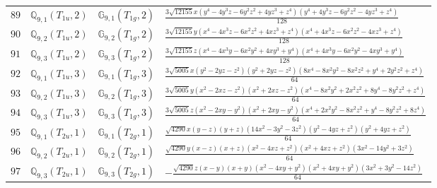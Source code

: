 \documentclass[fleqn,8pt,landscape]{jsarticle}
\begin{document}
\begin{table}[ht!]
\begin{center}
\begin{tabular}{cccl}
$ 89 $ & $ \mathbb{Q}_{9,1}(T_{1u},2) $ & $ \mathbb{G}_{9,1}(T_{1g},2) $ & $ \frac{3 \sqrt{12155} x \left(y^{4} - 4 y^{3} z - 6 y^{2} z^{2} + 4 y z^{3} + z^{4}\right) \left(y^{4} + 4 y^{3} z - 6 y^{2} z^{2} - 4 y z^{3} + z^{4}\right)}{128} $ \\
$ 90 $ & $ \mathbb{Q}_{9,2}(T_{1u},2) $ & $ \mathbb{G}_{9,2}(T_{1g},2) $ & $ \frac{3 \sqrt{12155} y \left(x^{4} - 4 x^{3} z - 6 x^{2} z^{2} + 4 x z^{3} + z^{4}\right) \left(x^{4} + 4 x^{3} z - 6 x^{2} z^{2} - 4 x z^{3} + z^{4}\right)}{128} $ \\
$ 91 $ & $ \mathbb{Q}_{9,3}(T_{1u},2) $ & $ \mathbb{G}_{9,3}(T_{1g},2) $ & $ \frac{3 \sqrt{12155} z \left(x^{4} - 4 x^{3} y - 6 x^{2} y^{2} + 4 x y^{3} + y^{4}\right) \left(x^{4} + 4 x^{3} y - 6 x^{2} y^{2} - 4 x y^{3} + y^{4}\right)}{128} $ \\
$ 92 $ & $ \mathbb{Q}_{9,1}(T_{1u},3) $ & $ \mathbb{G}_{9,1}(T_{1g},3) $ & $ \frac{3 \sqrt{5005} x \left(y^{2} - 2 y z - z^{2}\right) \left(y^{2} + 2 y z - z^{2}\right) \left(8 x^{4} - 8 x^{2} y^{2} - 8 x^{2} z^{2} + y^{4} + 2 y^{2} z^{2} + z^{4}\right)}{64} $ \\
$ 93 $ & $ \mathbb{Q}_{9,2}(T_{1u},3) $ & $ \mathbb{G}_{9,2}(T_{1g},3) $ & $ \frac{3 \sqrt{5005} y \left(x^{2} - 2 x z - z^{2}\right) \left(x^{2} + 2 x z - z^{2}\right) \left(x^{4} - 8 x^{2} y^{2} + 2 x^{2} z^{2} + 8 y^{4} - 8 y^{2} z^{2} + z^{4}\right)}{64} $ \\
$ 94 $ & $ \mathbb{Q}_{9,3}(T_{1u},3) $ & $ \mathbb{G}_{9,3}(T_{1g},3) $ & $ \frac{3 \sqrt{5005} z \left(x^{2} - 2 x y - y^{2}\right) \left(x^{2} + 2 x y - y^{2}\right) \left(x^{4} + 2 x^{2} y^{2} - 8 x^{2} z^{2} + y^{4} - 8 y^{2} z^{2} + 8 z^{4}\right)}{64} $ \\
$ 95 $ & $ \mathbb{Q}_{9,1}(T_{2u},1) $ & $ \mathbb{G}_{9,1}(T_{2g},1) $ & $ \frac{\sqrt{4290} x \left(y - z\right) \left(y + z\right) \left(14 x^{2} - 3 y^{2} - 3 z^{2}\right) \left(y^{2} - 4 y z + z^{2}\right) \left(y^{2} + 4 y z + z^{2}\right)}{64} $ \\
$ 96 $ & $ \mathbb{Q}_{9,2}(T_{2u},1) $ & $ \mathbb{G}_{9,2}(T_{2g},1) $ & $ \frac{\sqrt{4290} y \left(x - z\right) \left(x + z\right) \left(x^{2} - 4 x z + z^{2}\right) \left(x^{2} + 4 x z + z^{2}\right) \left(3 x^{2} - 14 y^{2} + 3 z^{2}\right)}{64} $ \\
$ 97 $ & $ \mathbb{Q}_{9,3}(T_{2u},1) $ & $ \mathbb{G}_{9,3}(T_{2g},1) $ & $ - \frac{\sqrt{4290} z \left(x - y\right) \left(x + y\right) \left(x^{2} - 4 x y + y^{2}\right) \left(x^{2} + 4 x y + y^{2}\right) \left(3 x^{2} + 3 y^{2} - 14 z^{2}\right)}{64} $ \\

\end{tabular}
\end{center}
\end{table}
\end{document}

